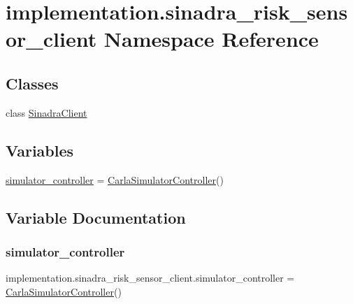 \hypertarget{namespaceimplementation_1_1sinadra__risk__sensor__client}{}\section{implementation.\+sinadra\+\_\+risk\+\_\+sensor\+\_\+client Namespace Reference}
\label{namespaceimplementation_1_1sinadra__risk__sensor__client}
\subsection*{Classes}
\begin{DoxyCompactItemize}
\item 
class \hyperlink{classimplementation_1_1sinadra__risk__sensor__client_1_1_sinadra_client}{Sinadra\+Client}
\end{DoxyCompactItemize}
\subsection*{Variables}
\begin{DoxyCompactItemize}
\item 
\hyperlink{namespaceimplementation_1_1sinadra__risk__sensor__client_a92b75bacca50dcb82c7de822070ecc89}{simulator\+\_\+controller} = \hyperlink{classimplementation_1_1simulators_1_1carla__simulator__controller_1_1_carla_simulator_controller}{Carla\+Simulator\+Controller}()
\end{DoxyCompactItemize}


\subsection{Variable Documentation}
\mbox{\label{namespaceimplementation_1_1sinadra__risk__sensor__client_a92b75bacca50dcb82c7de822070ecc89}} 
\subsubsection{\texorpdfstring{simulator\+\_\+controller}{simulator\_controller}}
{\footnotesize\ttfamily implementation.\+sinadra\+\_\+risk\+\_\+sensor\+\_\+client.\+simulator\+\_\+controller = \hyperlink{classimplementation_1_1simulators_1_1carla__simulator__controller_1_1_carla_simulator_controller}{Carla\+Simulator\+Controller}()}

